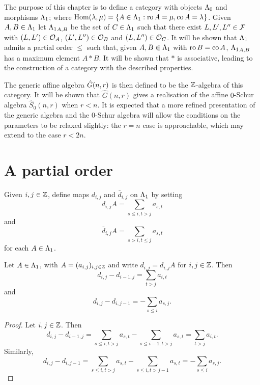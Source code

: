 \documentclass[a4paper, 11pt]{report}
\begin{document}
The purpose of this chapter is to define a category with objects ${\Lambda_0}$ and morphisms ${\Lambda_1}$; where $\operatorname{Hom}(\lambda,\mu) = \{A\in{\Lambda_1}: \operatorname{ro}{A}=\mu,\operatorname{co}{A}=\lambda\}$. Given $A,B\in{\Lambda_1}$ let ${\Lambda_1}_{A,B}$ be the set of $C\in{\Lambda_1}$ such that there exist $L,L',L''\in\mathcal{F}$ with $(L,L')\in\mathcal{O}_{A}$, $(L',L'')\in\mathcal{O}_{B}$ and $(L,L'')\in\mathcal{O}_{C}$. It will be shown that ${\Lambda_1}$ admits a partial order $\le$ such that, given $A,B\in{\Lambda_1}$ with $\operatorname{ro}{B}=\operatorname{co}{A}$, ${\Lambda_1}_{A,B}$ has a maximum element $A\ast B$. It will be shown that $\ast$ is associative, leading to the construction of a category with the described properties.

The generic affine algebra $\hat{G}(n,r)$ is then defined to be the $\mathbb{Z}$-algebra of this category. It will be shown that $\hat{G}(n,r)$ gives a realisation of the affine $0$-Schur algebra $\hat{S}_0(n,r)$ when $r<n$. It is expected that a more refined presentation of the generic algebra and the $0$-Schur algebra will allow the conditions on the parameters to be relaxed slightly: the $r=n$ case is approachable, which may extend to the case $r<2n$.

\section{A partial order}

Given $i,j\in\mathbb{Z}$, define maps $d_{i,j}$ and $\bar{d}_{i,j}$ on ${\Lambda_1}$ by setting
\begin{equation*}
d_{i,j}{A} = \sum_{s\le i,t>j} a_{s,t}
\end{equation*}
and
\begin{equation*}
\bar{d}_{i,j}{A} = \sum_{s>i, t\le j} a_{s,t}
\end{equation*}
for each $A\in{\Lambda_1}$.

\begin{lemma}\label{lemma:differentials}
Let $A\in{\Lambda_1}$, with $A=(a_{i,j})_{i,j\in\mathbb{Z}}$ and write $d_{i,j} = d_{i,j}A$ for $i,j\in\mathbb{Z}$. Then
\begin{equation*}
d_{i,j} - d_{i-1,j} = \sum_{t>j}a_{i,t}
\end{equation*}
and
\begin{equation*}
d_{i,j}-d_{i,j-1} = - \sum_{s\le i}a_{s,j}.
\end{equation*}
\end{lemma}

\begin{proof}
Let $i,j\in\mathbb{Z}$. Then
\begin{equation*}
d_{i,j} - d_{i-1,j} = \sum_{s\le i,t>j}a_{s,t} - \sum_{s\le i-1,t>j}a_{s,t} = \sum_{t>j}a_{i,t}.
\end{equation*}
Similarly,
\begin{equation*}
d_{i,j}-d_{i,j-1} = \sum_{s\le i,t>j}a_{s,t} - \sum_{s\le i,t>j-1}a_{s,t} = -\sum_{s\le i}a_{s,j}.
\end{equation*}
\end{proof}
\end{document}
